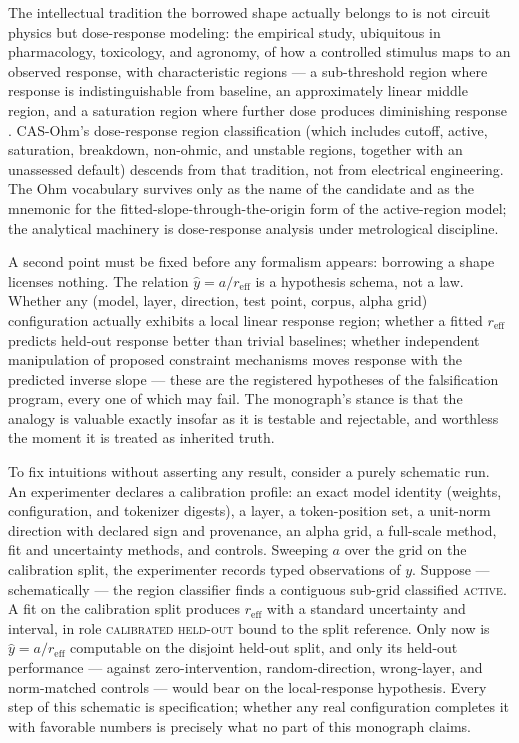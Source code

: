 The intellectual tradition the borrowed shape actually belongs to is not circuit physics but dose-response modeling: the empirical study, ubiquitous in pharmacology, toxicology, and agronomy, of how a controlled stimulus maps to an observed response, with characteristic regions --- a sub-threshold region where response is indistinguishable from baseline, an approximately linear middle region, and a saturation region where further dose produces diminishing response \cite{ritz}. CAS-Ohm's dose-response region classification (which includes cutoff, active, saturation, breakdown, non-ohmic, and unstable regions, together with an unassessed default) descends from that tradition, not from electrical engineering. The Ohm vocabulary survives only as the name of the candidate and as the mnemonic for the fitted-slope-through-the-origin form of the active-region model; the analytical machinery is dose-response analysis under metrological discipline.

A second point must be fixed before any formalism appears: borrowing a shape licenses nothing. The relation $\hat{y} = a / r_{\mathrm{eff}}$ is a hypothesis schema, not a law. Whether any (model, layer, direction, test point, corpus, alpha grid) configuration actually exhibits a local linear response region; whether a fitted $r_{\mathrm{eff}}$ predicts held-out response better than trivial baselines; whether independent manipulation of proposed constraint mechanisms moves response with the predicted inverse slope --- these are the registered hypotheses of the falsification program, every one of which may fail. The monograph's stance is that the analogy is valuable exactly insofar as it is testable and rejectable, and worthless the moment it is treated as inherited truth.

\begin{example}\label{ch01:ex:shape}
To fix intuitions without asserting any result, consider a purely schematic run. An experimenter declares a calibration profile: an exact model identity (weights, configuration, and tokenizer digests), a layer, a token-position set, a unit-norm direction with declared sign and provenance, an alpha grid, a full-scale method, fit and uncertainty methods, and controls. Sweeping $a$ over the grid on the calibration split, the experimenter records typed observations of $y$. Suppose --- schematically --- the region classifier finds a contiguous sub-grid classified \textsc{active}. A fit on the calibration split produces $r_{\mathrm{eff}}$ with a standard uncertainty and interval, in role \textsc{calibrated held-out} bound to the split reference. Only now is $\hat{y} = a/r_{\mathrm{eff}}$ computable on the disjoint held-out split, and only its held-out performance --- against zero-intervention, random-direction, wrong-layer, and norm-matched controls --- would bear on the local-response hypothesis. Every step of this schematic is specification; whether any real configuration completes it with favorable numbers is precisely what no part of this monograph claims.
\end{example}

